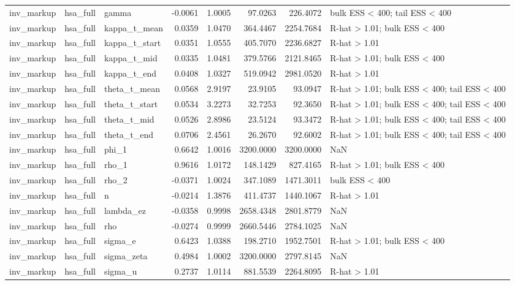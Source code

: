 \begin{tabular}{lllrrrrl}
inv\_markup & hsa\_full & gamma & -0.0061 & 1.0005 & 97.0263 & 226.4072 & bulk ESS < 400; tail ESS < 400 \\
inv\_markup & hsa\_full & kappa\_t\_mean & 0.0359 & 1.0470 & 364.4467 & 2254.7684 & R-hat > 1.01; bulk ESS < 400 \\
inv\_markup & hsa\_full & kappa\_t\_start & 0.0351 & 1.0555 & 405.7070 & 2236.6827 & R-hat > 1.01 \\
inv\_markup & hsa\_full & kappa\_t\_mid & 0.0335 & 1.0481 & 379.5766 & 2121.8465 & R-hat > 1.01; bulk ESS < 400 \\
inv\_markup & hsa\_full & kappa\_t\_end & 0.0408 & 1.0327 & 519.0942 & 2981.0520 & R-hat > 1.01 \\
inv\_markup & hsa\_full & theta\_t\_mean & 0.0568 & 2.9197 & 23.9105 & 93.0947 & R-hat > 1.01; bulk ESS < 400; tail ESS < 400 \\
inv\_markup & hsa\_full & theta\_t\_start & 0.0534 & 3.2273 & 32.7253 & 92.3650 & R-hat > 1.01; bulk ESS < 400; tail ESS < 400 \\
inv\_markup & hsa\_full & theta\_t\_mid & 0.0526 & 2.8986 & 23.5124 & 93.3472 & R-hat > 1.01; bulk ESS < 400; tail ESS < 400 \\
inv\_markup & hsa\_full & theta\_t\_end & 0.0706 & 2.4561 & 26.2670 & 92.6002 & R-hat > 1.01; bulk ESS < 400; tail ESS < 400 \\
inv\_markup & hsa\_full & phi\_1 & 0.6642 & 1.0016 & 3200.0000 & 3200.0000 & NaN \\
inv\_markup & hsa\_full & rho\_1 & 0.9616 & 1.0172 & 148.1429 & 827.4165 & R-hat > 1.01; bulk ESS < 400 \\
inv\_markup & hsa\_full & rho\_2 & -0.0371 & 1.0024 & 347.1089 & 1471.3011 & bulk ESS < 400 \\
inv\_markup & hsa\_full & n & -0.0214 & 1.3876 & 411.4737 & 1440.1067 & R-hat > 1.01 \\
inv\_markup & hsa\_full & lambda\_ez & -0.0358 & 0.9998 & 2658.4348 & 2801.8779 & NaN \\
inv\_markup & hsa\_full & rho & -0.0274 & 0.9999 & 2660.5446 & 2784.1025 & NaN \\
inv\_markup & hsa\_full & sigma\_e & 0.6423 & 1.0388 & 198.2710 & 1952.7501 & R-hat > 1.01; bulk ESS < 400 \\
inv\_markup & hsa\_full & sigma\_zeta & 0.4984 & 1.0002 & 3200.0000 & 2797.8145 & NaN \\
inv\_markup & hsa\_full & sigma\_u & 0.2737 & 1.0114 & 881.5539 & 2264.8095 & R-hat > 1.01 \\

\end{tabular}

